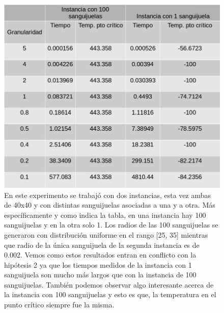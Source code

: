 \begin{figure}[H]
\centering
\includegraphics[scale=0.4]{../../Experimentos/Experimento2/instancias40x40.jpg}\caption{En este experimento se trabajó con dos instancias, esta vez ambas de 40x40 y con distintas sanguijuelas asociadas a una y a otra. Más específicamente y como indica la tabla, en una instancia hay 100 sanguijuelas y en la otra solo 1. Los radios de las 100 sanguijuelas se generaron con distribución uniforme en el rango [25, 35] mientras que radio de la única sanguijuela de la segunda instancia es de 0.002.  Vemos como estos resultados entran en conflicto con la hipótesis 2 ya que los tiempos medidos de la instancia con 1 sanguijuela son mucho más largos que con la instancia de 100 sanguijuelas. También podemos observar algo interesante acerca de la instancia con 100 sanguijuelas y esto es que, la temperatura en el punto crítico siempre fue la misma. }
\end{figure}

